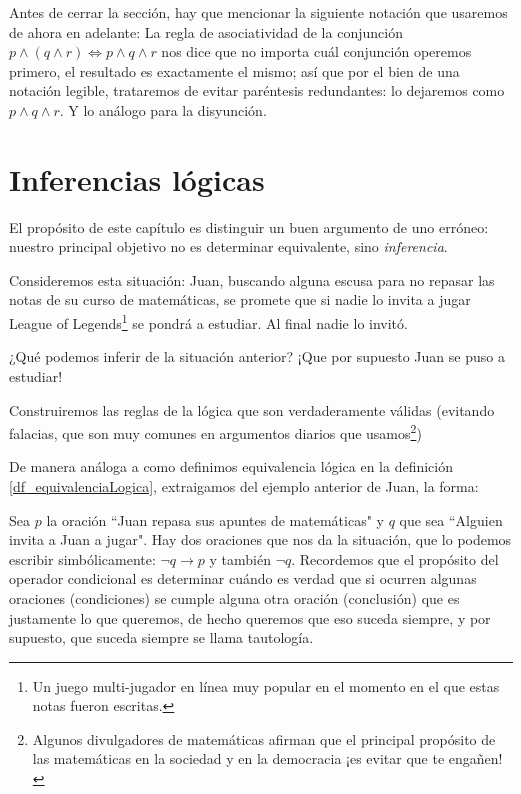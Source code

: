 \documentclass{book}
\theoremstyle{definition}
\begin{document}
Antes de cerrar la sección, hay que mencionar la siguiente notación que usaremos de ahora en adelante:
La regla de asociatividad de la conjunción $p \wedge (q \wedge r) \iff p \wedge q \wedge r$ nos dice que no importa cuál conjunción operemos primero, el resultado es exactamente el mismo; así que por el bien de una notación legible, trataremos de evitar paréntesis redundantes: lo dejaremos como $p \wedge q \wedge r$. Y lo análogo para la disyunción.

\section{Inferencias lógicas}
\label{sc_inferenciasLogicas}
El propósito de este capítulo es distinguir un buen argumento de uno erróneo: nuestro principal objetivo no es determinar equivalente, sino \emph{inferencia}.

Consideremos esta situación: Juan, buscando alguna escusa para no repasar las notas de su curso de matemáticas, se promete que si nadie lo invita a jugar League of Legends\footnote{Un juego multi-jugador en línea muy popular en el momento en el que estas notas fueron escritas.} se pondrá a estudiar. Al final nadie lo invitó.

¿Qué podemos inferir de la situación anterior? ¡Que por supuesto Juan se puso a estudiar!

Construiremos las reglas de la lógica que son verdaderamente válidas (evitando falacias, que son muy comunes en argumentos diarios que usamos\footnote{Algunos divulgadores de matemáticas afirman que el principal propósito de las matemáticas en la sociedad y en la democracia ¡es evitar que te engañen!})

De manera análoga a como definimos equivalencia lógica en la definición \ref{df_equivalenciaLogica}, extraigamos del ejemplo anterior de Juan, la forma:

Sea $p$ la oración ``Juan repasa sus apuntes de matemáticas" y $q$ que sea ``Alguien invita a Juan a jugar".
Hay dos oraciones que nos da la situación, que lo podemos escribir simbólicamente: $\neg q\rightarrow p$ y también $\neg q$.
Recordemos que el propósito del operador condicional es determinar cuándo es verdad que si ocurren algunas oraciones (condiciones) se cumple alguna otra oración (conclusión) que es justamente lo que queremos, de hecho queremos que eso suceda siempre, y por supuesto, que suceda siempre se llama tautología.
\end{document}
